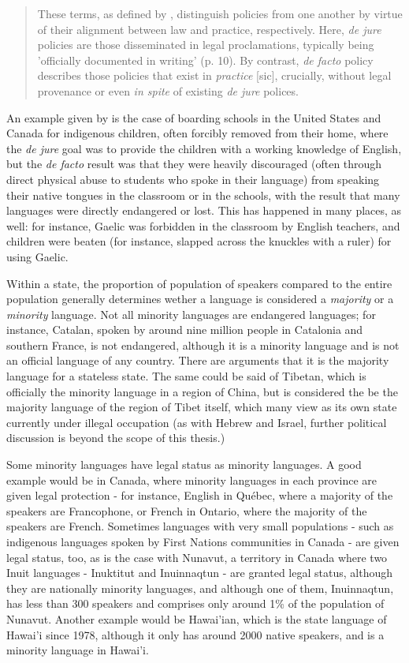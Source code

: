\begin{quote}
These terms, as defined by \citet{johnson2013language}, distinguish policies from one another by virtue of their alignment between law and practice, respectively. Here, {\it de jure} policies are those disseminated in legal proclamations, typically being 'officially documented in writing' (p. 10). By contrast, {\it de facto} policy describes those policies that exist in {\it practice} [sic], crucially, without legal provenance or even {\it in spite} of existing \textit{de jure} polices. \citep{hanks2017policy}
\end{quote}

An example given by \citet{hanks2017policy} is the case of boarding schools in the United States and Canada for indigenous children, often forcibly removed from their home, where the {\it de jure} goal was to provide the children with a working knowledge of English, but the {\it de facto} result was that they were heavily discouraged (often through direct physical abuse to students who spoke in their language) from speaking their native tongues in the classroom or in the schools, with the result that many languages were directly endangered or lost. This has happened in many places, as well: for instance, Gaelic was forbidden in the classroom by English teachers, and children were beaten (for instance, slapped across the knuckles with a ruler) for using Gaelic.

Within a state, the proportion of population of speakers compared to the entire population generally determines wether a language is considered a \textit{majority} or a \textit{minority} language. Not all minority languages are endangered languages; for instance, Catalan, spoken by around nine million people in Catalonia and southern France, is not endangered, although it is a minority language and is not an official language of any country. There are arguments that it is the majority language for a stateless state. The same could be said of Tibetan, which is officially the minority language in a region of China, but is considered the be the majority language of the region of Tibet itself, which many view as its own state currently under illegal occupation (as with Hebrew and Israel, further political discussion is beyond the scope of this thesis.)

Some minority languages have legal status as minority languages. A good example would be in Canada, where minority languages in each province are given legal protection - for instance, English in Qu\'ebec, where a majority of the speakers are Francophone, or French in Ontario, where the majority of the speakers are French. Sometimes languages with very small populations - such as indigenous languages spoken by First Nations communities in Canada - are given legal status, too, as is the case with Nunavut, a territory in Canada where two Inuit languages - Inuktitut and Inuinnaqtun - are granted legal status, although they are nationally minority languages, and although one of them, Inuinnaqtun, has less than 300 speakers and comprises only around 1\% of the population of Nunavut. Another example would be Hawai'ian, which is the state language of Hawai'i since 1978, although it only has around 2000 native speakers, and is a minority language in Hawai'i.


